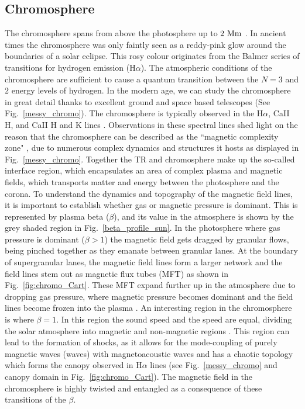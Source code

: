 \subsection{Chromosphere}
\label{ssec:Chromosphere}
The chromosphere spans from above the photosphere up to $2~\rm{Mm}$ \citep{Lang_2006ses}. In ancient times the chromosphere was only faintly seen as a reddy-pink glow around the boundaries of a solar eclipse. This rosy colour originates from the Balmer series of transitions for hydrogen emission (H$\alpha$). The atmospheric conditions of the chromosphere are sufficient to cause a quantum transition between the $N=3$ and $2$ energy levels of hydrogen. In the modern age, we can study the chromosphere in great detail thanks to excellent ground and space based telescopes (See Fig.~\ref{messy_chromo}). The chromosphere is typically observed in the H$\alpha$, CaII H, and CaII H and K lines \citep{Ayres2019sgspbook27A}. Observations in these spectral lines shed light on the reason that the chromosphere can be described as the ``magnetic complexity zone" \citep{Ayres2009astro2010S9A}, due to numerous complex dynamics and structures it hosts as displayed in Fig.~\ref{messy_chromo}. \np  
%
Together the TR and chromosphere make up the so-called interface region, which encapsulates an area of complex plasma and magnetic fields, which transports matter and energy between the photosphere and the corona. To understand the dynamics and topography of the magnetic field lines, it is important to establish whether gas or magnetic pressure is dominant. This is represented by plasma beta ($\beta$), and its value in the atmosphere is shown by the grey shaded region in Fig.~\ref{beta_profile_sun}. In the photosphere where gas pressure is dominant ($\beta>1$) the magnetic field gets dragged by granular flows, being pinched together as they emanate between granular lanes. At the boundary of supergranular lanes, the magnetic field lines form a larger network and the field lines stem out as magnetic flux tubes (MFT) as shown in Fig.~\ref{fig:chromo_Cart}. These MFT expand further up in the atmosphere due to dropping gas pressure, where magnetic pressure becomes dominant and the field lines become frozen into the plasma \citep{Ayres2009astro2010S9A}. An interesting region in the chromosphere is where $\beta=1$. In this region the sound speed and the \Alfven speed are equal, dividing the solar atmosphere into magnetic and non-magnetic regions \citep{Tsiropoula2012}. This region can lead to the formation of shocks, as it allows for the mode-coupling of purely magnetic waves (\Alfven waves) with magnetoacoustic waves \citep{Hollweg1982SoPh7535H, Rosenthal2002ApJ564508R,Bogdan2003ApJ599626B, Cally2008SoPh251251C, Wang2020ApJ891110W} and has a chaotic topology which forms the canopy observed in H$\alpha$ lines (see Fig.~\ref{messy_chromo} and canopy domain in Fig.~\ref{fig:chromo_Cart}). The magnetic field in the chromosphere is highly twisted and entangled as a consequence of these transitions of the $\beta$. \np
